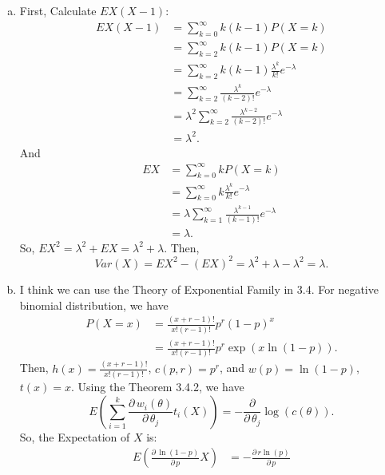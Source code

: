 \documentclass[14pt]{elegantbook}
\begin{document}
    \begin{solution}
        \begin{enumerate}[(a)]
            \item First, Calculate $EX(X-1)$: 
            \begin{align*}
                EX(X-1)&=\sum_{k=0}^{\infty}k(k-1)P(X=k)\\
                &=\sum_{k=2}^{\infty}k(k-1)P(X=k)\\
                &=\sum_{k=2}^{\infty}k(k-1)\frac{\lambda^k}{k!}e^{-\lambda}\\
                &=\sum_{k=2}^{\infty}\frac{\lambda^k}{(k-2)!}e^{-\lambda}\\
                &=\lambda^2\sum_{k=2}^{\infty}\frac{\lambda^{k-2}}{(k-2)!}e^{-\lambda}\\
                &=\lambda^2. 
            \end{align*}
            And \begin{align*}
                EX&=\sum_{k=0}^{\infty}kP(X=k)\\
                &=\sum_{k=0}^{\infty}k\frac{\lambda^k}{k!}e^{-\lambda}\\
                &=\lambda\sum_{k=1}^{\infty}\frac{\lambda^{k-1}}{(k-1)!}e^{-\lambda}\\
                &=\lambda.
            \end{align*}
            So, $EX^2=\lambda^2+EX=\lambda^2+\lambda$. Then, 
            \[Var(X)=EX^2-(EX)^2=\lambda^2+\lambda-\lambda^2=\lambda. \]
            \item \label{3.22.b} I think we can use the Theory of Exponential Family in 3.4. For negative binomial distribution, we have
            \begin{align*}
                P(X=x)&=\frac{(x+r-1)!}{x!(r-1)!}p^r(1-p)^x\\
                &=\frac{(x+r-1)!}{x!(r-1)!}p^r\exp\left(x\ln(1-p)\right). 
            \end{align*}
            Then, $h(x)=\frac{(x+r-1)!}{x!(r-1)!}$, $c(p, r)=p^r$, and $w(p)=\ln(1-p)$, $t(x)=x$. Using the Theorem 3.4.2, we have
            \[
                E\left(\sum_{i=1}^k\frac{\partial\,w_i(\theta)}{\partial\,\theta_j}t_i(X)\right)=-\frac{\partial}{\partial\,\theta_j}\log(c(\theta)).
            \]
            So, the Expectation of $X$ is: 
            \begin{align*}
                E\left(\frac{\partial\,\ln(1-p)}{\partial\,p}X\right)&=-\frac{\partial\,r\ln(p)}{\partial\,p}\\

\end{align*}
\end{enumerate}
\end{solution}
\end{document}
